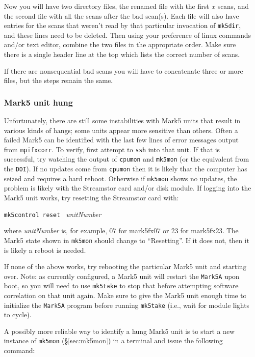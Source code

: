 Now you will have two directory files, the renamed file with the first $x$ scans, and the second file with all the scans after the bad scan(s).
Each file will also have entries for the scans that weren't read by that particular invocation of {\tt mk5dir}, and these lines need to be deleted.
Then using your preference of linux commands and/or text editor, combine the two files in the appropriate order.
Make sure there is a single header line at the top which lists the correct number of scans.

If there are nonsequential bad scans you will have to concatenate three or more files, but the steps remain the same.


\subsubsection{Mark5 unit hung} %
Unfortunately, there are still some instabilities with Mark5 units that result in various kinds of hangs; some units appear more sensitive than others.
Often a failed Mark5 can be identified with the last few lines of error messages output from {\tt mpifxcorr}.
To verify, first attempt to {\tt ssh} into that unit.
If that is successful, try watching the output of {\tt cpumon} and {\tt mk5mon} (or the equivalent from the {\tt DOI}).
If no updates come from {\tt cpumon} then it is likely that the computer has seized and requires a hard reboot.
Otherwise if {\tt mk5mon} shows no updates, the problem is likely with the Streamstor card and/or disk module.
If logging into the Mark5 unit works, try resetting the Streamstor card with:

{\tt mk5control reset } {\it unitNumber}

\noindent where {\it unitNumber} is, for example, 07 for mark5fx07 or 23 for mark5fx23.
The Mark5 state shown in {\tt mk5mon} should change to ``Resetting''.
If it does not, then it is likely a reboot is needed.

If none of the above works, try rebooting the particular Mark5 unit and starting over.
Note: as currently configured, a Mark5 unit will restart the {\tt Mark5A} upon boot, so you will need to use {\tt mk5take} to stop that before attempting software correlation on that unit again.  
Make sure to give the Mark5 unit enough time to initialize the {\tt Mark5A} program before running {\tt mk5take} (i.e., wait for module lights to cycle).

A possibly more reliable way to identify a hung Mark5 unit is to start a new instance of {\tt mk5mon} (\S\ref{sec:mk5mon}) in a terminal and issue the following command: 

